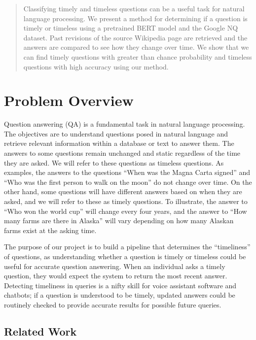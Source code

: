 \documentclass{article}
\begin{document}
\begin{abstract}
	Classifying timely and timeless questions can be a useful task for natural
	language processing. We present a method for determining if a question is
	timely or timeless using a pretrained BERT model and the Google NQ dataset.
	Past revisions of the source Wikipedia page are retrieved and the answers are
	compared to see how they change over time. We show that we can find timely
	questions with greater than chance probability and timeless questions with
	high accuracy using our method.

\end{abstract}

\section{Problem Overview}
\label{overview}
Question answering (QA) is a fundamental task in natural language processing.
The objectives are to understand questions posed in natural language and
retrieve relevant information within a database or text to answer them. The
answers to some questions remain unchanged and static regardless of the time
they are asked. We will refer to these questions as timeless questions. As
examples, the answers to the questions “When was the Magna Carta signed” and
“Who was the first person to walk on the moon” do not change over time. On the
other hand, some questions will have different answers based on when they are
asked, and we will refer to these as timely questions. To illustrate, the answer
to “Who won the world cup” will change every four years, and the answer to “How
many farms are there in Alaska” will vary depending on how many Alaskan farms
exist at the asking time.

The purpose of our project is to build a pipeline that determines the
“timeliness” of questions, as understanding whether a question is timely or
timeless could be useful for accurate question answering. When an individual
asks a timely question, they would expect the system to return the most recent
answer. Detecting timeliness in queries is a nifty skill for voice assistant
software and chatbots; if a question is understood to be timely, updated answers
could be routinely checked to provide accurate results for possible future
queries.


\subsection{Related Work}
\end{document}
